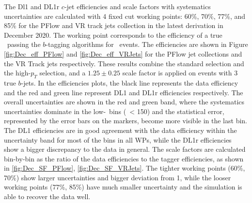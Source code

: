 \documentclass[letterpaper,12pt]{article}
\begin{document}
The Dl1 and DL1r $c$-jet efficiencies and scale factors with systematics 
uncertainties are calculated with 4 fixed cut working points: 
60\%, 70\%, 77\%, and 85\% for the PFlow and VR track jets collection in the latest derivation 
in December 2020. The working point corresponds to the efficiency of a true \bjet\ passing 
the $b$-tagging algorithms for \ttbar\ events. 
The efficiencies are shown in Figure \ref{fig:Dec_eff_PFlow} and \ref{fig:Dec_eff_VRJets} 
for the PFlow jet collections and the VR Track jets respectively. 
These results combine the standard selection and the high-$p_T$ selection, 
and a $1.25 \pm 0.25$ scale factor is applied on events with 3 true $b$-jets. 
In the efficiencies plots, the black line represents the data efficiency and the red and 
green line represent DL1 and DL1r efficiencies respectively. The overall uncertainties are shown 
in the red and green band, where the systematics uncertainties dominate 
in the low-\pt\ bins (\pt\ < 150) and the statistical error, represented by the error bars on the 
markers, become more visible in the last bin. The DL1 efficiencies are in good agreement with the 
data efficiency within the uncertainty band for most of the bins in all WPs, while the DL1r efficiencies 
show a bigger discrepancy to the data in general. 
The scale factors are calculated bin-by-bin as the ratio of the data efficiencies to the tagger efficiencies,
as shown in \ref{fig:Dec_SF_PFlow}, \ref{fig:Dec_SF_VRJets}. 
The tighter working points (60\%, 70\%) show larger uncertainties and bigger deviation from 1, while
the looser working points (77\%, 85\%) have much smaller uncertainty and the simulation is able to 
recover the data well. 
\end{document}
